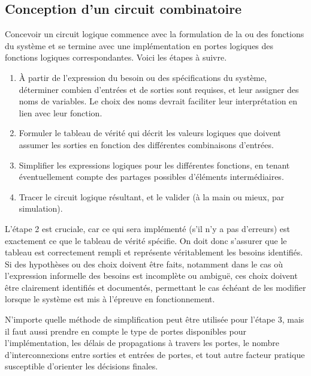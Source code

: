 \documentclass[11pt]{article}
\begin{document}
\subsection{Conception d'un circuit combinatoire}
\label{sec:orgddbcedf}

Concevoir un circuit logique commence avec la formulation de la ou des
fonctions du système et se termine avec une implémentation en portes
logiques des fonctions logiques correspondantes. Voici les étapes à
suivre.

\begin{enumerate}
\item À partir de l'expression du besoin ou des spécifications du
système, déterminer combien d'entrées et de sorties sont
requises, et leur assigner des noms de variables. Le choix des noms
devrait faciliter leur interprétation en lien avec leur fonction.

\item Formuler le tableau de vérité qui décrit les valeurs logiques que
doivent assumer les sorties en fonction des différentes
combinaisons d'entrées.

\item Simplifier les expressions logiques pour les différentes fonctions,
en tenant éventuellement compte des partages possibles d'éléments
intermédiaires.

\item Tracer le circuit logique résultant, et le valider (à la main ou
mieux, par simulation).
\end{enumerate}

L'étape 2 est cruciale, car ce qui sera implémenté (s'il n'y a pas
d'erreurs) est exactement ce que le tableau de vérité spécifie. On
doit donc s'assurer que le tableau est correctement rempli et
représente véritablement les besoins identifiés. Si des hypothèses ou
des choix doivent être faits, notamment dans le cas où l'expression
informelle des besoins est incomplète ou ambiguë, ces choix doivent
être clairement identifiés et documentés, permettant le cas échéant de
les modifier lorsque le système est mis à l'épreuve en fonctionnement.

N'importe quelle méthode de simplification peut être utilisée pour
l'étape 3, mais il faut aussi prendre en compte le type de portes
disponibles pour l'implémentation, les délais de propagations à
travers les portes, le nombre d'interconnexions entre sorties et
entrées de portes, et tout autre facteur pratique susceptible
d'orienter les décisions finales.
\end{document}
